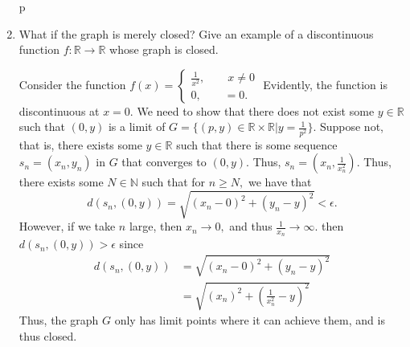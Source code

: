\documentclass[11pt]{article}
\newcommand{\bbN}{\mathbb{N}}
\newcommand{\bbR}{\mathbb{R}}
\begin{document}
\begin{enumerate}
\begin{solution}
    \end{solution}p
    \item 
    \begin{problem}
        What if the graph is merely closed? Give an example of a discontinuous function $f : \bbR \to \bbR$ whose graph is closed.
    \end{problem}
    \begin{solution}
        Consider the function $f(x)  = \begin{cases}
            \frac{1}{x^2}, \qquad x\neq 0\\
            0, \qquad = 0.
        \end{cases}$ Evidently, the function is discontinuous at $x = 0.$ We need to show that there does not exist some $y\in \bbR$ such that $(0,y)$ is a limit of $G = \{(p,y)\in \bbR \times \bbR | y = \frac{1}{p^2}\}.$ Suppose not, that is, there exists some $y\in \bbR$ such that there is some sequence $s_n = (x_n, y_n)$ in $G$ that converges to $(0,y).$ Thus, $s_n = (x_n, \frac{1}{x_n^2}).$ Thus, there exists some $N\in \bbN$ such that for $n\geq N,$ we have that 
        \[d(s_n, (0,y)) = \sqrt{(x_n - 0)^2 + (y_n - y)^2} < \epsilon.\]  However, if we take $n$ large, then $x_n \to 0,$ and thus $\frac{1}{x_n} \to \infty.$ then $d(s_n, (0,y))>\epsilon$ since 
        \begin{align*}
            d(s_n, (0,y)) &= \sqrt{(x_n - 0)^2 + (y_n - y)^2}\\
            &= \sqrt{(x_n)^2 + (\frac{1}{x_n^2} - y)^2}
        \end{align*}
        Thus, the graph $G$ only has limit points where it can achieve them, and is thus closed.
    \end{solution}
\end{enumerate}

\newpage
\end{document}
